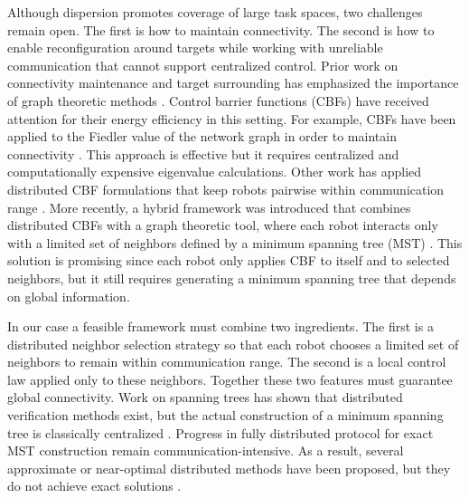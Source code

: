 \documentclass[conference]{IEEEconf}
\theoremstyle{plain}
\begin{document}
Although dispersion promotes coverage of large task spaces, two challenges remain open. The first is how to maintain connectivity. The second is how to enable reconfiguration around targets while working with unreliable communication that cannot support centralized control. Prior work on connectivity maintenance and target surrounding has emphasized the importance of graph theoretic methods \cite{olfati2007,dimartino2006}. Control barrier functions (CBFs) have received attention for their energy efficiency in this setting. For example, CBFs have been applied to the Fiedler value of the network graph in order to maintain connectivity \cite{capelli2020}. This approach is effective but it requires centralized and computationally expensive eigenvalue calculations. Other work has applied distributed CBF formulations that keep robots pairwise within communication range \cite{sabattini2013,capelli2021}. More recently, a hybrid framework was introduced that combines distributed CBFs with a graph theoretic tool, where each robot interacts only with a limited set of neighbors defined by a minimum spanning tree (MST) \cite{yang2023}. This solution is promising since each robot only applies CBF to itself and to selected neighbors, but it still requires generating a minimum spanning tree that depends on global information.

In our case a feasible framework must combine two ingredients. The first is a distributed neighbor selection strategy so that each robot chooses a limited set of neighbors to remain within communication range. The second is a local control law applied only to these neighbors. Together these two features must guarantee global connectivity. Work on spanning trees has shown that distributed verification methods exist, but the actual construction of a minimum spanning tree is classically centralized \cite{boruvka1926, kruskal1956, prim1957}. Progress in fully distributed protocol for exact MST construction \cite{gallager1983, awerbuch1987} remain communication-intensive. As a result, several approximate or near-optimal distributed methods have been proposed, but they do not achieve exact solutions \cite{khan2008}.
\end{document}

